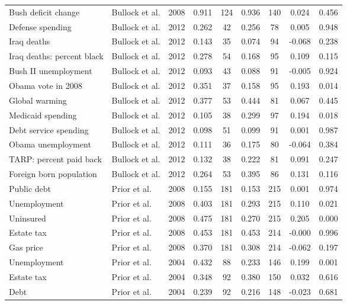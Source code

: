 \begin{longtable}{lllcccccc}
  Bush deficit change & Bullock et al. & 2008 & 0.911 &  124 & 0.936 &  140 & 0.024 & 0.456 \\ 
  Defense spending & Bullock et al. & 2012 & 0.262 &   42 & 0.256 &   78 & 0.005 & 0.948 \\ 
  Iraq deaths & Bullock et al. & 2012 & 0.143 &   35 & 0.074 &   94 & -0.068 & 0.238 \\ 
  Iraq deaths: percent black & Bullock et al. & 2012 & 0.278 &   54 & 0.168 &   95 & 0.109 & 0.115 \\ 
  Bush II unemployment & Bullock et al. & 2012 & 0.093 &   43 & 0.088 &   91 & -0.005 & 0.924 \\ 
  Obama vote in 2008 & Bullock et al. & 2012 & 0.351 &   37 & 0.158 &   95 & 0.193 & 0.014 \\ 
  Global warming & Bullock et al. & 2012 & 0.377 &   53 & 0.444 &   81 & 0.067 & 0.445 \\ 
  Medicaid spending & Bullock et al. & 2012 & 0.105 &   38 & 0.299 &   97 & 0.194 & 0.018 \\ 
  Debt service spending & Bullock et al. & 2012 & 0.098 &   51 & 0.099 &   91 & 0.001 & 0.987 \\ 
  Obama unemployment & Bullock et al. & 2012 & 0.111 &   36 & 0.175 &   80 & -0.064 & 0.384 \\ 
  TARP: percent paid back & Bullock et al. & 2012 & 0.132 &   38 & 0.222 &   81 & 0.091 & 0.247 \\ 
  Foreign born population & Bullock et al. & 2012 & 0.264 &   53 & 0.395 &   86 & 0.131 & 0.116 \\ 
  Public debt & Prior et al. & 2008 & 0.155 &  181 & 0.153 &  215 & 0.001 & 0.974 \\ 
  Unemployment & Prior et al. & 2008 & 0.403 &  181 & 0.293 &  215 & 0.110 & 0.021 \\ 
  Uninsured & Prior et al. & 2008 & 0.475 &  181 & 0.270 &  215 & 0.205 & 0.000 \\ 
  Estate tax & Prior et al. & 2008 & 0.453 &  181 & 0.453 &  214 & -0.000 & 0.996 \\ 
  Gas price & Prior et al. & 2008 & 0.370 &  181 & 0.308 &  214 & -0.062 & 0.197 \\ 
  Unemployment & Prior et al. & 2004 & 0.432 &   88 & 0.233 &  146 & 0.199 & 0.001 \\ 
  Estate tax & Prior et al. & 2004 & 0.348 &   92 & 0.380 &  150 & 0.032 & 0.616 \\ 
  Debt & Prior et al. & 2004 & 0.239 &   92 & 0.216 &  148 & -0.023 & 0.681 \\ 

\end{longtable}
